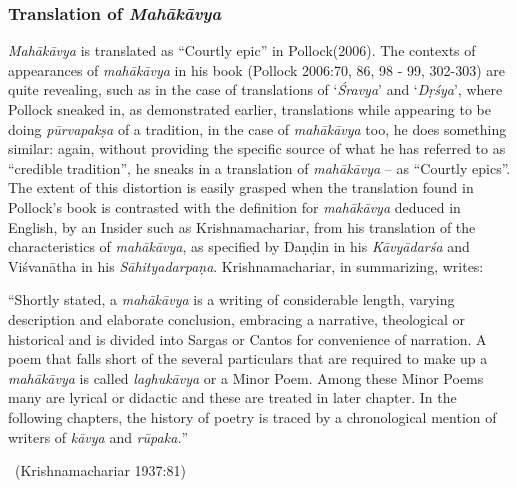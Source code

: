 \vspace{-.4cm}

\subsubsection{Translation of \textit{Mahākāvya}}

\textit{Mahākāvya} is translated as “Courtly epic” in Pollock(2006). The contexts of appearances of \textit{mahākāvya} in his book (Pollock 2006:70, 86, 98 - 99, 302-303) are quite revealing, such as in the case of translations of ‘\textit{Śravya}’ and ‘\textit{Dṛśya}’, where Pollock sneaked in, as demonstrated earlier, translations while appearing to be doing \textit{pūrvapakṣa} of a tradition, in the case of \textit{mahākāvya} too, he does something similar: again, without providing the specific source of what he has referred to as “credible tradition”, he sneaks in a translation of \textit{mahākāvya} – as “Courtly epics”. The extent of this distortion is easily grasped when the translation found in Pollock’s book is contrasted with the definition for \textit{mahākāvya} deduced in English, by an Insider such as Krishnamachariar, from his translation of the characteristics of \textit{mahākāvya}, as specified by Daṇḍin in his \textit{Kāvyādarśa} and Viśvanātha in his \textit{Sāhityadarpaṇa}. Krishnamachariar, in summarizing, writes:

\begin{myquote}
“Shortly stated, a \textit{mahākāvya} is a writing of considerable length, varying description and elaborate conclusion, embracing a narrative, theological or historical and is divided into Sargas or Cantos for convenience of narration. A poem that falls short of the several particulars that are required to make up a \textit{mahākāvya} is called \textit{laghukāvya} or a Minor Poem. Among these Minor Poems many are lyrical or didactic and these are treated in later chapter. In the following chapters, the history of poetry is traced by a chronological mention of writers of \textit{kāvya} and \textit{rūpaka.}” 

~\hfill (Krishnamachariar 1937:81)
\end{myquote}

